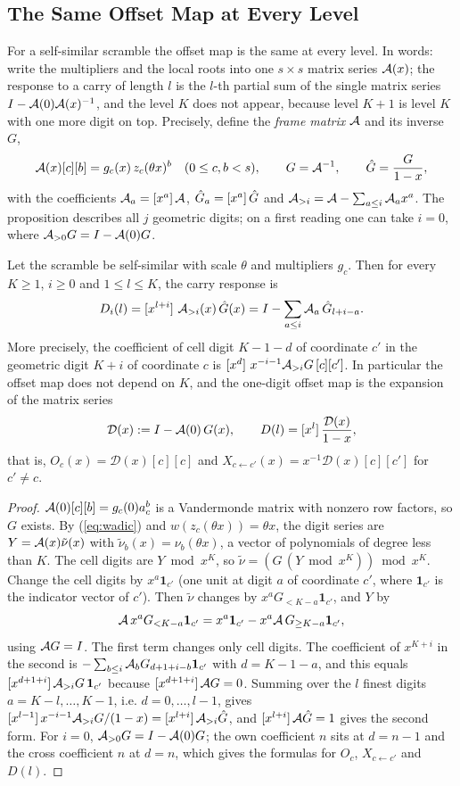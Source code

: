 \subsection{The Same Offset Map at Every Level}
For a self-similar scramble the offset map is the same at every level. In words: write the multipliers and the local roots into one $s\times s$ matrix series $\mathcal{A}(x)$; the response to a carry of length $l$ is the $l$-th partial sum of the single matrix series $I-\mathcal{A}(0)\mathcal{A}(x)^{-1}$, and the level $K$ does not appear, because level $K+1$ is level $K$ with one more digit on top. Precisely, define the \emph{frame matrix} $\mathcal{A}$ and its inverse $G$,
\[
\mathcal{A}(x)[c][b]=g_c(x)\,z_c(\theta x)^b\quad(0\le c,b<s),\qquad G=\mathcal{A}^{-1},\qquad \hat G=\frac G{1-x},
\]
with the coefficients $\mathcal{A}_a=[x^{a}]\,\mathcal{A}$, $\hat G_a=[x^{a}]\,\hat G$ and $\mathcal{A}_{>i}=\mathcal{A}-\sum_{a\le i}\mathcal{A}_ax^a$. The proposition describes all $j$ geometric digits; on a first reading one can take $i=0$, where $\mathcal{A}_{>0}G=I-\mathcal{A}(0)G$.

\begin{proposition}\label{prop:law}
Let the scramble be self-similar with scale $\theta$ and multipliers $g_c$. Then for every $K\ge1$, $i\ge0$ and $1\le l\le K$, the carry response is
\[
D_i(l)=[x^{l+i}]\,\,\mathcal{A}_{>i}(x)\,\hat G(x)=I-\sum_{a\le i}\mathcal{A}_a\,\hat G_{l+i-a}.
\]
More precisely, the coefficient of cell digit $K-1-d$ of coordinate $c'$ in the geometric digit $K+i$ of coordinate $c$ is $[x^{d}]\,\,x^{-i-1}\mathcal{A}_{>i}G\,[c][c']$. In particular the offset map does not depend on $K$, and the one-digit offset map is the expansion of the matrix series
\[
\mathcal D(x):=I-\mathcal{A}(0)\,G(x),\qquad D(l)=[x^{l}]\,\frac{\mathcal D(x)}{1-x},
\]
that is, $O_c(x)=\mathcal D(x)[c][c]$ and $X_{c\leftarrow c'}(x)=x^{-1}\mathcal D(x)[c][c']$ for $c'\ne c$.
\end{proposition}

\begin{proof}
$\mathcal{A}(0)[c][b]=g_c(0)a_c^b$ is a Vandermonde matrix with nonzero row factors, so $G$ exists. By (\ref{eq:wadic}) and $w(z_c(\theta x))=\theta x$, the digit series are $Y=\mathcal{A}(x)\tilde\nu(x)$ with $\tilde\nu_b(x)=\nu_b(\theta x)$, a vector of polynomials of degree less than $K$. The cell digits are $Y\bmod x^K$, so $\tilde\nu=(G\,(Y\bmod x^K))\bmod x^K$. Change the cell digits by $x^a \mathbf 1_{c'}$ (one unit at digit $a$ of coordinate $c'$, where $\mathbf 1_{c'}$ is the indicator vector of $c'$). Then $\tilde\nu$ changes by $x^aG_{<K-a}\mathbf 1_{c'}$, and $Y$ by
\[
\mathcal{A}\,x^aG_{<K-a}\mathbf 1_{c'}=x^a\mathbf 1_{c'}-x^a\mathcal{A}\,G_{\ge K-a}\mathbf 1_{c'},
\]
using $\mathcal{A} G=I$. The first term changes only cell digits. The coefficient of $x^{K+i}$ in the second is $-\sum_{b\le i}\mathcal{A}_bG_{d+1+i-b}\mathbf 1_{c'}$ with $d=K-1-a$, and this equals $[x^{d+1+i}]\,\mathcal{A}_{>i}G\,\mathbf 1_{c'}$ because $[x^{d+1+i}]\,\mathcal{A} G=0$. Summing over the $l$ finest digits $a=K-l,\dots,K-1$, i.e. $d=0,\dots,l-1$, gives $[x^{l-1}]\,x^{-i-1}\mathcal{A}_{>i}G/(1-x)=[x^{l+i}]\,\mathcal{A}_{>i}\hat G$, and $[x^{l+i}]\,\mathcal{A}\hat G=1$ gives the second form. For $i=0$, $\mathcal{A}_{>0}G=I-\mathcal{A}(0)G$; the own coefficient $n$ sits at $d=n-1$ and the cross coefficient $n$ at $d=n$, which gives the formulas for $O_c$, $X_{c\leftarrow c'}$ and $D(l)$.
\end{proof}

